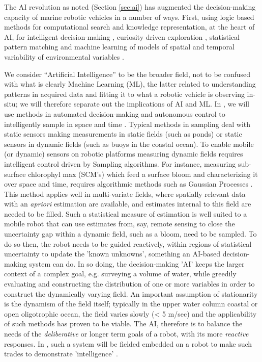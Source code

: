 The AI revolution as noted (Section \ref{sec:ai}) has augmented the
decision-making capacity of marine robotic vehicles in a number of
ways. First, using logic based methods for computational search and
knowledge representation, at the heart of AI, for intelligent
decision-making \cite{ryan10,fossum18,fossum18b}, curiosity driven
exploration \cite{girdhar14}, statistical pattern matching and machine
learning of models of spatial and temporal variability of
environmental variables \cite{fossum19b}.

We consider ``Artificial Intelligence'' to be the broader field, not
to be confused with what is clearly Machine Learning (ML), the latter
related to understanding patterns in acquired data and fitting it to
what a robotic vehicle is observing in-situ; we will therefore
separate out the implications of AI and ML. In \proe, we will use
methods in automated decision-making and autonomous control to
intelligently sample in space and time \cite{graham12}. Typical
methods in sampling deal with static sensors making measurements in
static fields (such as ponds) or static sensors in dynamic fields
(such as buoys in the coastal ocean). To enable mobile (or dynamic)
sensors on robotic platforms measuring dynamic fields requires
intelligent control driven by Sampling algorithms. For instance,
measuring sub-surface chlorophyl max (SCM's) which feed a surface
bloom and characterizing it over space and time, requires algorithmic
methods such as Gaussian Processes \cite{fossum18}. This method
applies well in multi-variate fields, where spatially relevant data
with an \emph{apriori} estimation are available, and estimates
internal to this field are needed to be filled. Such a statistical
measure of estimation is well suited to a mobile robot that can use
estimates from, say, remote sensing to close the uncertainty gap
within a dynamic field, such as a bloom, need to be sampled. To do so
then, the robot needs to be guided reactively, within regions of
statistical uncertainty to update the 'known unknowns', something an
AI-based decision-making system can do. In so doing, the
decision-making 'AI' keeps the larger context of a complex goal,
e.g. surveying a volume of water, while greedily evaluating and
constructing the distribution of one or more variables in order to
construct the dynamically varying field. An important assumption of
stationarity is the dynamism of the field itself; typically in the
upper water column coastal or open oligotrophic ocean, the field
varies slowly (< 5 m/sec) and the applicability of such methods has
proven to be viable. The AI, therefore is to balance the needs of the
\emph{deliberative} or longer term goals of a robot, with its more
\emph{reactive} responses. In \proe, such a system will be fielded
embedded on a robot to make such trades to demonstrate
'intelligence' \cite{fossum18,fossum18b}.


